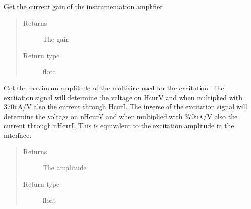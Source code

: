 \documentclass[letterpaper,10pt,english]{sphinxmanual}
\begin{document}
\begin{fulllineitems}
\begin{fulllineitems}
\end{fulllineitems}


\begin{fulllineitems}
\label{\detokenize{index:TiePieLCR_settings.TiePieLCR_settings.get_gain_value}}
\sphinxAtStartPar
Get the current gain of the instrumentation amplifier
\begin{quote}\begin{description}
\item[{Returns}] \leavevmode
\sphinxAtStartPar
The gain

\item[{Return type}] \leavevmode
\sphinxAtStartPar
float

\end{description}\end{quote}

\end{fulllineitems}


\begin{fulllineitems}
\label{\detokenize{index:TiePieLCR_settings.TiePieLCR_settings.get_gen_amplitude}}
\sphinxAtStartPar
Get the maximum amplitude of the multi\sphinxhyphen{}sine used for the excitation. The excitation signal will determine the voltage on HcurV and when multiplied with 370uA/V also the current through HcurI. The inverse of the excitation signal will determine the voltage on nHcurV and when multiplied with 370uA/V also the current through nHcurI. This is equivalent to the excitation amplitude in the interface.
\begin{quote}\begin{description}
\item[{Returns}] \leavevmode
\sphinxAtStartPar
The amplitude

\item[{Return type}] \leavevmode
\sphinxAtStartPar
float

\end{description}\end{quote}


\end{fulllineitems}
\end{fulllineitems}
\end{document}
